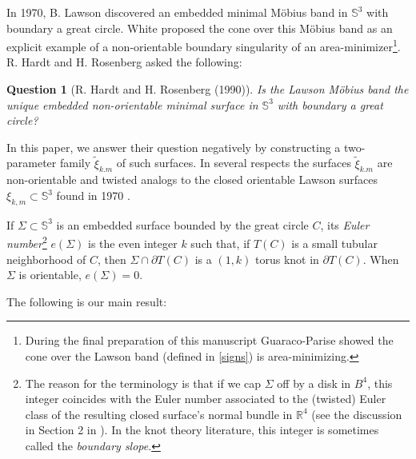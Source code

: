 \documentclass[11pt, reqno]{amsart}
\newtheorem{question}[thm]{Question}
\numberwithin{equation}{section}
\begin{document}
In 1970, B. Lawson \cite{LS} discovered an embedded minimal M\"obius band in $\mathbb{S}^3$ with boundary a great circle.  White \cite{LectureNotesOtis} proposed the cone over this M\"{o}bius band as an explicit example of a non-orientable boundary singularity of an area-minimizer\footnote{During the final preparation of this manuscript Guaraco-Parise \cite{guaracoWhitesConeMobius2026} showed the cone over the Lawson band (defined in \eqref{signs}) is area-minimizing.}. R. Hardt and H. Rosenberg \cite{HR} asked the following:
\begin{question}[R. Hardt and H. Rosenberg (1990)]
Is the Lawson M\"obius band the unique embedded non-orientable minimal surface in $\mathbb{S}^3$ with boundary a great circle?
\end{question}

In this paper, we answer their question negatively by constructing a two-parameter family $\tilde{\xi}_{k.m}$ of such surfaces.  In several respects the surfaces $\tilde{\xi}_{k.m}$ are non-orientable and twisted analogs to the closed orientable Lawson surfaces $\xi_{k,m}\subset\mathbb{S}^3$ found in 1970 \cite{LS}. 

If $\Sigma\subset\mathbb{S}^3$ is an embedded surface bounded by the great circle $C$, its \emph{Euler number}\footnote{The reason for the terminology is that if we cap $\Sigma$ off by a disk in $B^4$, this integer coincides with the Euler number associated to the (twisted) Euler class of the resulting closed surface's normal bundle in $\mathbb{R}^4$ (see the discussion in Section 2 in \cite{Conway}). In the knot theory literature, this integer is sometimes called the \emph{boundary slope}.}  $e(\Sigma)$ is the even integer $k$ such that, if $T(C)$ is a small tubular neighborhood of $C$, then $\Sigma \cap \partial T(C)$ is a $(1,k)$ torus knot in $\partial T(C)$.  When $\Sigma$ is orientable, $e(\Sigma)=0$.

The following is our main result:
\end{document}
